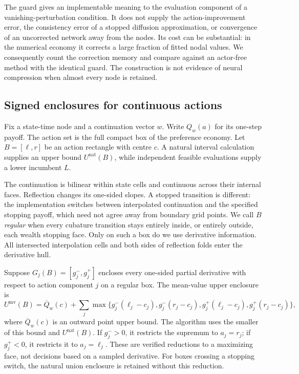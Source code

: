 The guard gives an implementable meaning to the evaluation component of a vanishing-perturbation condition. It does not supply the action-improvement error, the consistency error of a stopped diffusion approximation, or convergence of an uncorrected network away from the nodes. Its cost can be substantial: in the numerical economy it corrects a large fraction of fitted nodal values. We consequently count the correction memory and compare against an actor-free method with the identical guard. The construction is not evidence of neural compression when almost every node is retained.

\subsection{Signed enclosures for continuous actions}
Fix a state-time node and a continuation vector $w$. Write $Q_w(a)$ for its one-step payoff. The action set is the full compact box of the preference economy. Let $B=[\ell,r]$ be an action rectangle with centre $c$. A natural interval calculation supplies an upper bound $U^{\mathrm{nat}}(B)$, while independent feasible evaluations supply a lower incumbent $L$.

The continuation is bilinear within state cells and continuous across their internal faces. Reflection changes its one-sided slopes. A stopped transition is different: the implementation switches between interpolated continuation and the specified stopping payoff, which need not agree away from boundary grid points. We call $B$ \emph{regular} when every cubature transition stays entirely inside, or entirely outside, each wealth stopping face. Only on such a box do we use derivative information. All intersected interpolation cells and both sides of reflection folds enter the derivative hull.

Suppose $G_j(B)=[g_j^-,g_j^+]$ encloses every one-sided partial derivative with respect to action component $j$ on a regular box. The mean-value upper enclosure is
\begin{equation}\label{eq:r9mean}
 U^{\mathrm{mv}}(B)=\overline Q_w(c)+
 \sum_j\max\{g_j^-(\ell_j-c_j),g_j^-(r_j-c_j),g_j^+(\ell_j-c_j),g_j^+(r_j-c_j)\},
\end{equation}
where $\overline Q_w(c)$ is an outward point upper bound. The algorithm uses the smaller of this bound and $U^{\mathrm{nat}}(B)$. If $g_j^->0$, it restricts the supremum to $a_j=r_j$; if $g_j^+<0$, it restricts it to $a_j=\ell_j$. These are verified reductions to a maximizing face, not decisions based on a sampled derivative. For boxes crossing a stopping switch, the natural union enclosure is retained without this reduction.

